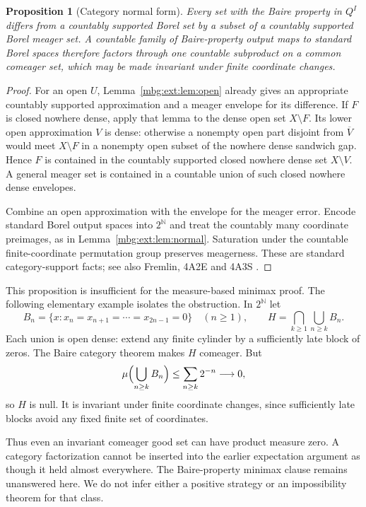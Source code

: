 \documentclass[11pt,letterpaper]{article}
\newtheorem{proposition}[theorem]{Proposition}
\theoremstyle{definition}
\newcommand{\N}{\mathbb N}
\begin{document}
\begin{proposition}[Category normal form]
\label{mbg:ext:prop:category}
Every set with the Baire property in $Q^I$ differs from a countably supported Borel set by a subset of a countably supported Borel meager set. A countable family of Baire-property output maps to standard Borel spaces therefore factors through one countable subproduct on a common comeager set, which may be made invariant under finite coordinate changes.
\end{proposition}
\begin{proof}
For an open $U$, Lemma~\ref{mbg:ext:lem:open} already gives an appropriate countably supported approximation and a meager envelope for its difference. If $F$ is closed nowhere dense, apply that lemma to the dense open set $X\setminus F$. Its lower open approximation $V$ is dense: otherwise a nonempty open part disjoint from $\overline V$ would meet $X\setminus F$ in a nonempty open subset of the nowhere dense sandwich gap. Hence $F$ is contained in the countably supported closed nowhere dense set $X\setminus V$. A general meager set is contained in a countable union of such closed nowhere dense envelopes.

Combine an open approximation with the envelope for the meager error. Encode standard Borel output spaces into $2^\N$ and treat the countably many coordinate preimages, as in Lemma~\ref{mbg:ext:lem:normal}. Saturation under the countable finite-coordinate permutation group preserves meagerness. These are standard category-support facts; see also Fremlin, 4A2E and 4A3S \cite{ext:Fremlin4A}.
\end{proof}

This proposition is insufficient for the measure-based minimax proof. The following elementary example isolates the obstruction. In $2^\N$ let
\[
B_n=\{x:x_n=x_{n+1}=\cdots=x_{2n-1}=0\}\quad(n\ge1),
\qquad H=\bigcap_{k\ge1}\bigcup_{n\ge k}B_n.
\]
Each union is open dense: extend any finite cylinder by a sufficiently late block of zeros. The Baire category theorem makes $H$ comeager. But
\[
\mu\Bigl(\bigcup_{n\ge k}B_n\Bigr)
\le\sum_{n\ge k}2^{-n}\longrightarrow0,
\]
so $H$ is null. It is invariant under finite coordinate changes, since sufficiently late blocks avoid any fixed finite set of coordinates.

Thus even an invariant comeager good set can have product measure zero. A category factorization cannot be inserted into the earlier expectation argument as though it held almost everywhere. The Baire-property minimax clause remains unanswered here. We do not infer either a positive strategy or an impossibility theorem for that class.
\end{document}
